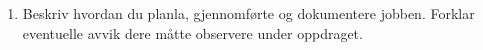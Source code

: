 \begin{enumerate}
	\item Beskriv hvordan du planla, gjennomførte og dokumentere jobben. Forklar eventuelle avvik dere måtte observere under oppdraget. 
\end{enumerate}






\vfil

\vfil \eject

















